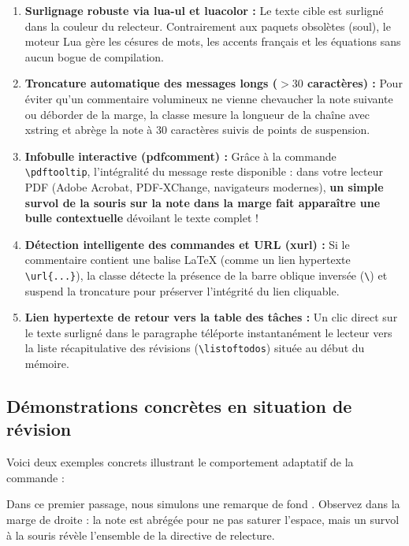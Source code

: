 \begin{enumerate}
  \item \textbf{Surlignage robuste via \textsf{lua-ul} et \textsf{luacolor} :}
  Le texte cible est surligné dans la couleur du relecteur. Contrairement aux paquets obsolètes (\textsf{soul}), le moteur Lua gère les césures de mots, les accents français et les équations sans aucun bogue de compilation.
  
  \item \textbf{Troncature automatique des messages longs ($> 30$ caractères) :}
  Pour éviter qu'un commentaire volumineux ne vienne chevaucher la note suivante ou déborder de la marge, la classe mesure la longueur de la chaîne avec \textsf{xstring} et abrège la note à 30 caractères suivis de points de suspension.

  \item \textbf{Infobulle interactive (\textsf{pdfcomment}) :}
  Grâce à la commande \texttt{\textbackslash pdftooltip}, l'intégralité du message reste disponible : dans votre lecteur PDF (Adobe Acrobat, PDF-XChange, navigateurs modernes), \textbf{un simple survol de la souris sur la note dans la marge fait apparaître une bulle contextuelle} dévoilant le texte complet !

  \item \textbf{Détection intelligente des commandes et URL (\textsf{xurl}) :}
  Si le commentaire contient une balise \LaTeX{} (comme un lien hypertexte \texttt{\textbackslash url\{...\}}), la classe détecte la présence de la barre oblique inversée (\texttt{\textbackslash}) et suspend la troncature pour préserver l'intégrité du lien cliquable.

  \item \textbf{Lien hypertexte de retour vers la table des tâches :}
  Un clic direct sur le texte surligné dans le paragraphe téléporte instantanément le lecteur vers la liste récapitulative des révisions (\texttt{\textbackslash listoftodos}) située au début du mémoire.
\end{enumerate}

\subsection{Démonstrations concrètes en situation de révision}
\label{subsec:demos_todoh}

Voici deux exemples concrets illustrant le comportement adaptatif de la commande :

Dans ce premier passage, nous simulons une remarque de fond .
Observez dans la marge de droite : la note est abrégée pour ne pas saturer l'espace, mais un survol à la souris révèle l'ensemble de la directive de relecture.

